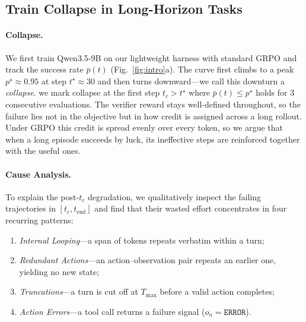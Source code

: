\documentclass[letterpaper]{article} %
\begin{document}
\subsection{Train Collapse in Long-Horizon Tasks}
\label{subsec:prelim_misassign}

\paragraph{Collapse.} 
We first train Qwen3.5-9B \citep{qwen3.5} on our lightweight harness with standard GRPO and track the success rate $\bar p(t)$ (Fig.~\ref{fig:intro}a). 
The curve first climbs to a peak $p^\star\!\approx\!0.95$ at step $t^\star\approx30$ and then turns downward---we call this downturn a \emph{collapse}.
we mark collapse at the first step $t_c>t^\star$ where $\bar p(t)\le p^\star$ holds for $3$ consecutive evaluations.
The verifier reward stays well-defined throughout, so the failure lies not in the objective but in how credit is assigned across a long rollout.
Under GRPO this credit is spread evenly over every token, so we argue that when a long episode succeeds by luck, its ineffective steps are reinforced together with the useful ones.

\paragraph{Cause Analysis.}
To explain the post-$t_c$ degradation, we qualitatively inspect the failing trajectories in $[t_c, t_{\text{end}}]$ and find that their wasted effort concentrates in four recurring patterns:
\begin{enumerate}[nosep,leftmargin=*]
    \item \emph{Internal Looping}---a span of tokens repeats verbatim within a turn;
    \item \emph{Redundant Actions}---an action--observation pair repeats an earlier one, yielding no new state;
    \item \emph{Truncations}---a turn is cut off at $T_{\max}$ before a valid action completes;
    \item \emph{Action Errors}---a tool call returns a failure signal ($o_n=\texttt{ERROR}$).
\end{enumerate}
\end{document}
